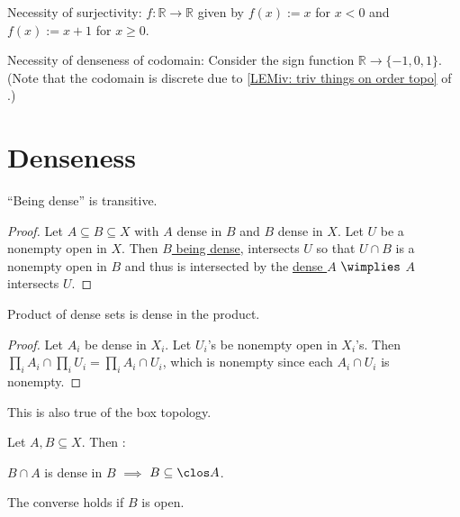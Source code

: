 	\begin{rmk}
		\begin{mylist}
			\item Necessity of surjectivity: $f\colon \mathbb{R\to R}$ given by $f(x) := x$ for $x < 0$ and $f(x) := x + 1$ for $x\ge 0$.
			
			\item Necessity of denseness of codomain: Consider the sign function $\mathbb R\to \{-1, 0, 1\}$. (Note that the codomain is discrete due to \ref{LEMiv: triv things on order topo} of .)
		\end{mylist}
	\end{rmk}
	



\section{Denseness}

	\begin{lem}\label{LEM: denseness is transitive}
		``Being dense'' is transitive.
	\end{lem}
	
	\begin{proof}
		Let $A\subseteq B\subseteq X$ with $A$ dense in $B$ and $B$ dense in $X$. Let $U$ be a nonempty open in $X$. Then \uline{$B$ being dense}, intersects $U$ so that $U\cap B$ is a nonempty open in $B$ and thus is intersected by the \uline{dense $A$} $\wimplies$ $A$ intersects $U$.
	\end{proof}
	
	
	\begin{lem}\label{LEM: prd of dense is dense}
		Product of dense sets is dense in the product.
	\end{lem}
	
	\begin{proof}
		Let $A_i$ be dense in $X_i$. Let $U_i$'s be nonempty open in $X_i$'s. Then $\prod_i A_i\cap \prod_i U_i = \prod_i A_i\cap U_i$, which is nonempty since each $A_i\cap U_i$ is nonempty.\myMargin{
			\AC used.
		}
	\end{proof}
	
	\begin{rmk}
		This is also true of the box topology.
	\end{rmk}
	
	
	
	\begin{lem}\label{LEM: dense on a subset}
		Let $A, B\subseteq X$. Then \tfh:
		\begin{mylist}
			\item $B\cap A$ is dense in $B$ $\implies$ $B\subseteq \clos A$.
			
			\item\label{LEMii: dense on a subset} The converse holds if $B$ is open.
		\end{mylist}
	\end{lem}
	
